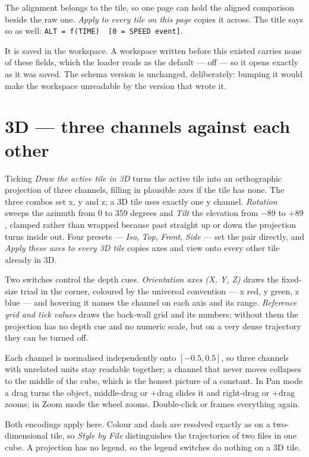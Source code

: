 \documentclass[11pt,a4paper,oneside]{report}
\newcommand{\code}[1]{\texttt{#1}}
\newcommand{\key}[1]{\textsf{\small\fbox{#1}}}
\begin{document}
The alignment belongs to the tile, so one page can hold the aligned comparison
beside the raw one. \emph{Apply to every tile on this page} copies it across.
The title says so as well: \code{ALT = f(TIME)~~[0 = SPEED event]}.

It is saved in the workspace. A workspace written before this existed carries
none of these fields, which the loader reads as the default --- off --- so it
opens exactly as it was saved. The schema version is unchanged, deliberately:
bumping it would make the workspace unreadable by the version that wrote it.

\section{3D --- three channels against each other}

Ticking \emph{Draw the active tile in 3D} turns the active tile into an
orthographic projection of three channels, filling in plausible axes if the tile
has none. The three combos set x, y and z; a 3D tile uses exactly one y channel.
\emph{Rotation} sweeps the azimuth from 0 to 359 degrees and \emph{Tilt} the
elevation from $-89$ to $+89$, clamped rather than wrapped because past straight
up or down the projection turns inside out. Four presets --- \emph{Iso},
\emph{Top}, \emph{Front}, \emph{Side} --- set the pair directly, and \emph{Apply
these axes to every 3D tile} copies axes and view onto every other tile already
in 3D.

Two switches control the depth cues. \emph{Orientation axes (X, Y, Z)} draws the
fixed-size triad in the corner, coloured by the universal convention --- x red, y
green, z blue --- and hovering it names the channel on each axis and its range.
\emph{Reference grid and tick values} draws the back-wall grid and its numbers;
without them the projection has no depth cue and no numeric scale, but on a very
dense trajectory they can be turned off.

Each channel is normalised independently onto $[-0.5, 0.5]$, so three channels
with unrelated units stay readable together; a channel that never moves collapses
to the middle of the cube, which is the honest picture of a constant. In Pan mode
a drag turns the object, middle-drag or \key{Shift}+drag slides it and
right-drag or \key{Ctrl}+drag zooms; in Zoom mode the wheel zooms. Double-click
or \key{Ctrl+0} frames everything again.

Both encodings apply here. Colour and dash are resolved exactly as on a
two-dimensional tile, so \emph{Style by File} distinguishes the trajectories of
two files in one cube. A projection has no legend, so the legend switches do
nothing on a 3D tile.
\end{document}
